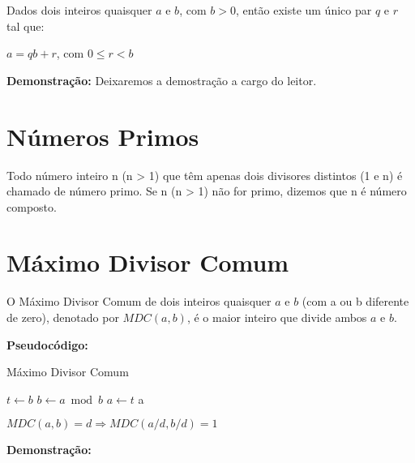 \begin{theorem}\label{algoritmo_divisao}
Dados dois inteiros quaisquer $a$ e $b$, com $b > 0$, então existe um único par $q$ e $r$ tal que:

$a = qb + r$, com $0 \leq r < b$
\end{theorem}

\textbf{Demonstração:}
Deixaremos a demostração a cargo do leitor.




\section{Números Primos}

\begin{definition} 
Todo número inteiro n (n > 1) que têm apenas dois divisores distintos (1 e n) é chamado de número primo. Se n (n > 1) não for primo, dizemos que n é número composto.
\end{definition}


\section{Máximo Divisor Comum}

\begin{definition}
O Máximo Divisor Comum de dois inteiros quaisquer $a$ e $b$ (com a ou b diferente de zero), denotado por $MDC(a,b)$, é o maior inteiro que divide ambos $a$ e $b$.
\end{definition}

\textbf{Pseudocódigo:}
\begin{algorithm}
\caption{Máximo Divisor Comum}\label{mdc}
\begin{algorithmic}[1]
\State $t \gets b$
\State $b \gets a \bmod b$
\State $a \gets t$
\EndWhile
\State \Return a
\EndProcedure
\end{algorithmic}
\end{algorithm}

\begin{corollary}\label{divisibilidade_mdc}
$MDC(a,b) = d \Rightarrow MDC(a/d, b/d) = 1$
\end{corollary}

\textbf{Demonstração:}





